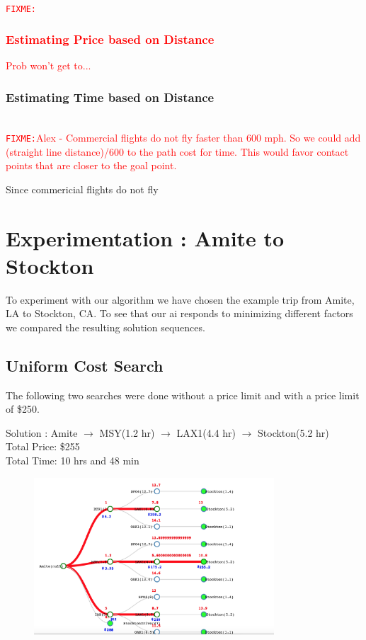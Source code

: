 \documentclass[11pt]{article}
\newcommand{\FIXME}[1]{ \ \\ \hspace* {-1.5 cm}
  \textcolor{red}{\texttt{FIXME:}#1} \medskip\par}
\begin{document}
\FIXME{\subsubsection{Estimating Price based on Distance} Prob won't get to...}

\subsubsection{Estimating Time based on Distance}

\FIXME{Alex - Commercial flights do not fly faster than 600 mph. So we could add (straight line distance)/600 to the path cost for time. This would favor contact points that are closer to the goal point.}

Since commericial flights do not fly 

\section{Experimentation : Amite to Stockton}

To experiment with our algorithm we have chosen the example trip from Amite, LA to Stockton, CA. To see that our ai responds to minimizing different factors we compared the resulting solution sequences. 

\subsection{Uniform Cost Search}

The following two searches were done without a price limit and with a price limit of \$250.
\begin{center}
Solution : Amite $\rightarrow$ MSY(1.2 hr) $\rightarrow$ LAX1(4.4 hr) $\rightarrow$ Stockton(5.2 hr) \\
\quad Total Price: \$255 \\
\quad Total Time: 10 hrs and 48 min
\end{center}

\begin{figure}[!ht]
  \centering
  \includegraphics[width=0.8\textwidth]{time}
  \label{fig:time}
\end{figure}
\end{document}
